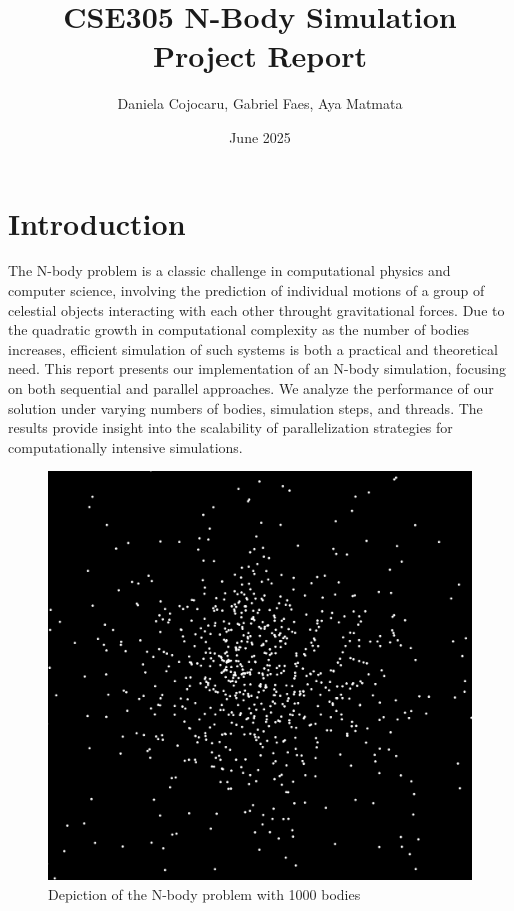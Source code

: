 \documentclass{article}
\title{CSE305 N-Body Simulation Project Report}
\author{Daniela Cojocaru, Gabriel Faes, Aya Matmata}
\date{June 2025}
\begin{document}
\maketitle
\thispagestyle{empty}
\newpage

\section{Introduction}
The N-body problem is a classic challenge in computational physics and computer science, involving the prediction of individual motions of a group of celestial objects interacting with each other throught gravitational forces. Due to the quadratic growth in computational complexity as the number of bodies increases, efficient simulation of such systems is both a practical and theoretical need. This report presents our implementation of an N-body simulation, focusing on both sequential and parallel approaches. We analyze the performance of our solution under varying numbers of bodies, simulation steps, and threads. The results provide insight into the scalability of parallelization strategies for computationally intensive simulations.

\begin{figure}[H]
        \centering
        \includegraphics[width=1\linewidth]{many_bodies.png}
        \caption{Depiction of the N-body problem with 1000 bodies}
        \label{fig:enter-label}
\end{figure}
\end{document}
